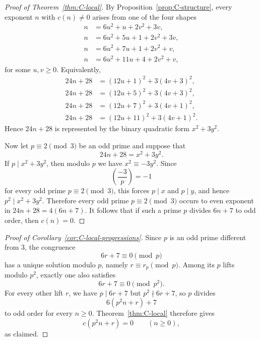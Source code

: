\documentclass[reqno]{amsart}
\theoremstyle{plain}
\theoremstyle{definition}
\theoremstyle{remark}
\numberwithin{equation}{section}
\begin{document}
\begin{proof}[Proof of Theorem~\ref{thm:C-local}]
By Proposition~\ref{prop:C-structure}, every exponent $n$ with $c(n)\ne 0$ arises from one of the four shapes
\begin{align*}
n&=6u^2+u+2v^2+3v, \\
n&=6u^2+5u+1+2v^2+3v, \\
n&=6u^2+7u+1+2v^2+v, \\
n&=6u^2+11u+4+2v^2+v,
\end{align*}
for some $u,v\ge 0$. Equivalently,
\begin{align*}
24n+28&=(12u+1)^2+3(4v+3)^2, \\
24n+28&=(12u+5)^2+3(4v+3)^2, \\
24n+28&=(12u+7)^2+3(4v+1)^2, \\
24n+28&=(12u+11)^2+3(4v+1)^2.
\end{align*}
Hence $24n+28$ is represented by the binary quadratic form $x^2+3y^2$.

Now let $p\equiv 2\pmod{3}$ be an odd prime and suppose that
\[
24n+28=x^2+3y^2.
\]
If $p\mid x^2+3y^2$, then modulo $p$ we have $x^2\equiv -3y^2$. Since
\[
\left(\frac{-3}{p}\right)=-1
\]
for every odd prime $p\equiv 2\pmod{3}$, this forces $p\mid x$ and $p\mid y$, and hence $p^2\mid x^2+3y^2$.
Therefore every odd prime $p\equiv 2\pmod{3}$ occurs to even exponent in $24n+28=4(6n+7)$. It follows that if such a prime $p$ divides $6n+7$ to odd order, then $c(n)=0$.
\end{proof}

\begin{proof}[Proof of Corollary~\ref{cor:C-local-progressions}]
Since $p$ is an odd prime different from $3$, the congruence
\[
6r+7\equiv 0\pmod{p}
\]
has a unique solution modulo $p$, namely $r\equiv r_p\pmod{p}$. Among its $p$ lifts modulo $p^2$, exactly one also satisfies
\[
6r+7\equiv 0\pmod{p^2}.
\]
For every other lift $r$, we have $p\mid 6r+7$ but $p^2\nmid 6r+7$, so $p$ divides
\[
6(p^2n+r)+7
\]
to odd order for every $n\ge 0$. Theorem~\ref{thm:C-local} therefore gives
\[
c(p^2n+r)=0\qquad(n\ge 0),
\]
as claimed.
\end{proof}
%
\end{document}
